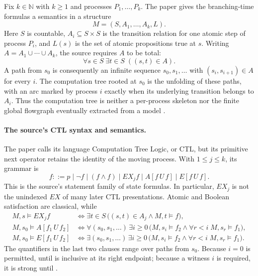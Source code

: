 Fix \(k\in\mathbb N\) with \(k\geq1\) and processes
\(P_1,\ldots,P_k\).  The paper gives the branching-time formulas a semantics
in a structure
\[
 M=(S,A_1,\ldots,A_k,L).
\]
Here \(S\) is countable, \(A_i\subseteq S\times S\) is the transition
relation for one atomic step of process \(P_i\), and \(L(s)\) is the set of
atomic propositions true at \(s\).  Writing
\(A=A_1\cup\cdots\cup A_k\), the source requires \(A\) to be total:
\[
 \forall s\in S\;\exists t\in S\;((s,t)\in A).
\]
A path from \(s_0\) is consequently an infinite sequence
\(s_0,s_1,\ldots\) with \((s_i,s_{i+1})\in A\) for every \(i\).
The computation tree rooted at \(s_0\) is the unfolding of these paths, with
an arc marked by process \(i\) exactly when its underlying transition belongs
to \(A_i\).  Thus the computation tree is neither a per-process skeleton nor
the finite global flowgraph eventually extracted from a model
\cite[pp.~53--54]{ClarkeEmerson1981}.

\paragraph{The source's CTL syntax and semantics.}
The paper calls its language Computation Tree Logic, or CTL, but its primitive
next operator retains the identity of the moving process.  With
\(1\leq j\leq k\), its grammar is
\[
 f ::= p
 \mid \neg f
 \mid (f\land f)
 \mid EX_j f
 \mid A[f\,U\,f]
 \mid E[f\,U\,f].
\]
This is the source's statement family of state formulas.  In particular,
\(EX_j\) is not the unindexed \(EX\) of many later CTL presentations.
Atomic and Boolean satisfaction are classical, while
\[
\begin{aligned}
 M,s\models EX_j f
 &\iff \exists t\in S\,
        \bigl((s,t)\in A_j \land M,t\models f\bigr),\\
 M,s_0\models A[f_1\,U\,f_2]
 &\iff
   \forall(s_0,s_1,\ldots)\,
   \exists i\geq0\,
   \bigl(M,s_i\models f_2
     \land \forall r<i\;M,s_r\models f_1\bigr),\\
 M,s_0\models E[f_1\,U\,f_2]
 &\iff
   \exists(s_0,s_1,\ldots)\,
   \exists i\geq0\,
   \bigl(M,s_i\models f_2
     \land \forall r<i\;M,s_r\models f_1\bigr).
\end{aligned}
\]
The quantifiers in the last two clauses range over paths from \(s_0\).
Because \(i=0\) is permitted, until is inclusive at its right endpoint;
because a witness \(i\) is required, it is strong until
\cite[pp.~54--55]{ClarkeEmerson1981}.

